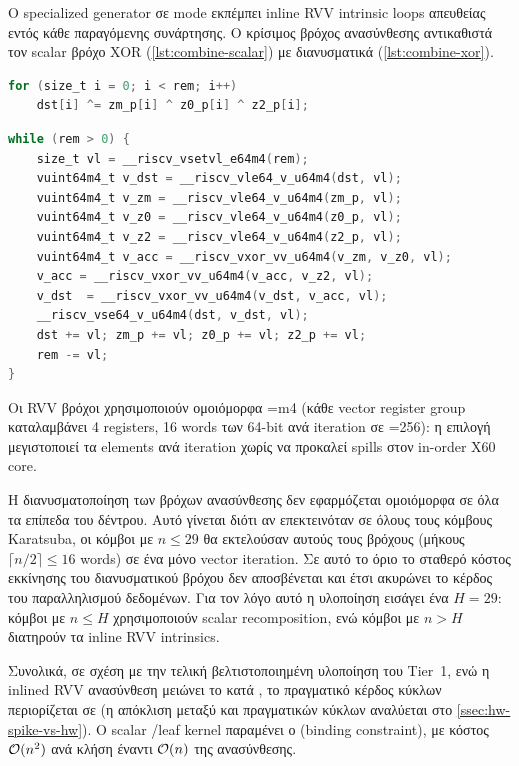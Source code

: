 Ο specialized generator σε  mode εκπέμπει inline RVV intrinsic
loops απευθείας εντός κάθε παραγόμενης  συνάρτησης. Ο κρίσιμος
βρόχος ανασύνθεσης αντικαθιστά τον scalar βρόχο XOR (\cref{lst:combine-scalar}) 
με διανυσματικά  (\cref{lst:combine-xor}).

\begin{lstlisting}[language=C,
  caption={Scalar combine XOR (πριν).},
  label={lst:combine-scalar}]
for (size_t i = 0; i < rem; i++)
    dst[i] ^= zm_p[i] ^ z0_p[i] ^ z2_p[i];
\end{lstlisting}

\begin{lstlisting}[language=C,
  caption={Inline RVV combine XOR (μετά).},
  label={lst:combine-xor}]
while (rem > 0) {
    size_t vl = __riscv_vsetvl_e64m4(rem);
    vuint64m4_t v_dst = __riscv_vle64_v_u64m4(dst, vl);
    vuint64m4_t v_zm = __riscv_vle64_v_u64m4(zm_p, vl);
    vuint64m4_t v_z0 = __riscv_vle64_v_u64m4(z0_p, vl);
    vuint64m4_t v_z2 = __riscv_vle64_v_u64m4(z2_p, vl);
    vuint64m4_t v_acc = __riscv_vxor_vv_u64m4(v_zm, v_z0, vl);
    v_acc = __riscv_vxor_vv_u64m4(v_acc, v_z2, vl);
    v_dst  = __riscv_vxor_vv_u64m4(v_dst, v_acc, vl);
    __riscv_vse64_v_u64m4(dst, v_dst, vl);
    dst += vl; zm_p += vl; z0_p += vl; z2_p += vl;
    rem -= vl;
}
\end{lstlisting}

Οι RVV βρόχοι χρησιμοποιούν ομοιόμορφα \LMUL=m4 (κάθε vector register group
καταλαμβάνει \num{4} registers, \num{16} words των \num{64}-bit ανά iteration
σε \VLEN=\num{256}): η επιλογή μεγιστοποιεί τα elements ανά iteration χωρίς
να προκαλεί spills στον in-order X60 core.

Η διανυσματοποίηση των βρόχων ανασύνθεσης δεν εφαρμόζεται ομοιόμορφα σε όλα τα επίπεδα του δέντρου.
Αυτό γίνεται διότι αν επεκτεινόταν σε όλους τους κόμβους Karatsuba, οι
κόμβοι με $n \leq 29$ θα εκτελούσαν αυτούς τους βρόχους (μήκους
$\lceil n/2 \rceil \leq 16$ words) σε ένα μόνο vector iteration. Σε αυτό
το όριο το σταθερό κόστος εκκίνησης του διανυσματικού βρόχου δεν
αποσβένεται και έτσι ακυρώνει το κέρδος του παραλληλισμού δεδομένων. Για τον
λόγο αυτό η υλοποίηση εισάγει ένα  $H=29$:
κόμβοι με $n \leq H$ χρησιμοποιούν scalar recomposition, ενώ κόμβοι με
$n > H$ διατηρούν τα inline RVV intrinsics.

Συνολικά, σε σχέση με την τελική βελτιστοποιημένη υλοποίηση του Tier~1, ενώ η inlined 
RVV ανασύνθεση μειώνει το \instret κατά , το πραγματικό κέρδος κύκλων
περιορίζεται σε  (η απόκλιση μεταξύ \instret και πραγματικών κύκλων 
αναλύεται στο \cref{ssec:hw-spike-vs-hw}). O scalar \clmul/\clmulh leaf kernel παραμένει 
ο  (binding constraint), με κόστος $\mathcal{O}(n^2)$ 
ανά κλήση έναντι $\mathcal{O}(n)$ της ανασύνθεσης.

